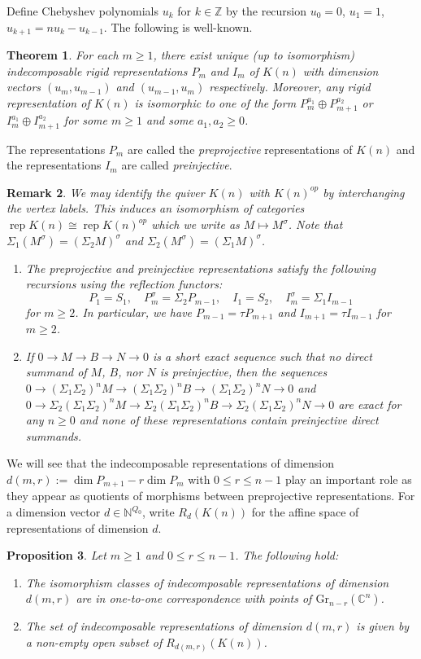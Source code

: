 \documentclass{amsart}
\newtheorem{theorem}{Theorem}[section]
\newtheorem{proposition}[theorem]{Proposition}
\newtheorem{remark}[theorem]{Remark}
\numberwithin{equation}{section}
\newcommand{\rep}{\operatorname{rep}}
\newcommand{\Gr}{\mathrm{Gr}}
\newcommand{\CC}{\mathbb{C}}
\newcommand{\ZZ}{\mathbb{Z}}
\newcommand{\NN}{\mathbb{N}}
\newcommand{\ses}[3]{0\rightarrow #1\rightarrow #2\rightarrow#3\rightarrow 0}
\begin{document}
Define Chebyshev polynomials $u_k$ for $k\in\ZZ$ by the recursion $u_0=0$, $u_1=1$, $u_{k+1}=nu_k-u_{k-1}$.
The following is well-known.
\begin{theorem}
  \label{th:rigids}
  For each $m\ge1$, there exist unique (up to isomorphism) indecomposable rigid representations $P_m$ and $I_m$ of $K(n)$ with dimension vectors $(u_m,u_{m-1})$ and $(u_{m-1},u_m)$ respectively. 
  Moreover, any rigid representation of $K(n)$ is isomorphic to one of the form $P_m^{a_1}\oplus P_{m+1}^{a_2}$ or $I_m^{a_1}\oplus I_{m+1}^{a_2}$ for some $m\ge1$ and some $a_1,a_2\ge0$.
\end{theorem}
The representations $P_m$ are called the \emph{preprojective} representations of $K(n)$ and the representations $I_m$ are called \emph{preinjective}.
\begin{remark}
  \label{rem:reflection recursion}
  We may identify the quiver $K(n)$ with $K(n)^{op}$ by interchanging the vertex labels.
  This induces an isomorphism of categories $\rep K(n)\cong\rep K(n)^{op}$ which we write as $M\mapsto M^\sigma$.
  Note that $\Sigma_1(M^\sigma)=(\Sigma_2 M)^\sigma$ and $\Sigma_2(M^\sigma)=(\Sigma_1 M)^\sigma$.
  \begin{enumerate}
    \item The preprojective and preinjective representations satisfy the following recursions using the reflection functors:
      \[P_1=S_1,\quad P_m^\sigma=\Sigma_2 P_{m-1},\quad I_1=S_2,\quad I_m^\sigma=\Sigma_1 I_{m-1}\]
      for $m\ge2$.
      In particular, we have $P_{m-1}=\tau P_{m+1}$ and $I_{m+1}=\tau I_{m-1}$ for $m\ge2$.
    \item If $\ses{M}{B}{N}$ is a short exact sequence such that no direct summand of $M$, $B$, nor $N$ is preinjective, then the sequences $\ses{(\Sigma_1\Sigma_2)^nM}{(\Sigma_1\Sigma_2)^nB}{(\Sigma_1\Sigma_2)^nN}$ and $\ses{\Sigma_2(\Sigma_1\Sigma_2)^nM}{\Sigma_2(\Sigma_1\Sigma_2)^nB}{\Sigma_2(\Sigma_1\Sigma_2)^nN}$ are exact for any $n\ge0$ and none of these representations contain preinjective direct summands.
  \end{enumerate}
\end{remark}
We will see that the indecomposable representations of dimension $d(m,r):=\dim P_{m+1}-r\dim P_m$ with $0\leq r\leq n-1$ play an important role as they appear as quotients of morphisms between preprojective representations.
For a dimension vector $d\in\NN^{Q_0}$, write $R_d(K(n))$ for the affine space of representations of dimension $d$.
\begin{proposition}
  \label{pro:indecomposables}
  Let $m\geq 1$ and $0\le r\le n-1$.
  The following hold:
  \begin{enumerate}
    \item The isomorphism classes of indecomposable representations of dimension $d(m,r)$ are in one-to-one correspondence with points of $\Gr_{n-r}(\CC^n)$.
    \item The set of indecomposable representations of dimension $d(m,r)$ is given by a non-empty open subset of $R_{d(m,r)}(K(n))$. 
  \end{enumerate}
\end{proposition}
\end{document}
